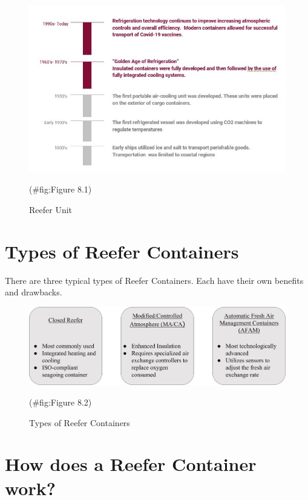 \documentclass[
]{book}
\begin{document}
\begin{figure}

{\centering \includegraphics{./Images/seaport operation/Reefer Unit} 

}

\caption{Reefer Unit}(\#fig:Figure 8.1)
\end{figure}

\hypertarget{seaport-containers}{%
\section{Types of Reefer Containers}\label{seaport-containers}}

There are three typical types of Reefer Containers. Each have their own benefits and drawbacks.

\begin{figure}

{\centering \includegraphics{./Images/seaport operation/Types of Reefer Containers} 

}

\caption{Types of Reefer Containers}(\#fig:Figure 8.2)
\end{figure}

\hypertarget{seaport-work}{%
\section{How does a Reefer Container work?}\label{seaport-work}}
\end{document}
